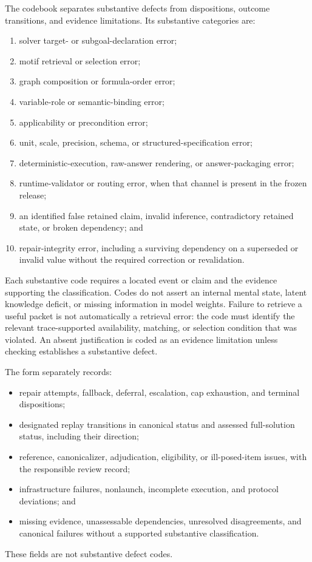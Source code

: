 \documentclass[10pt]{article} %
\providecommand{\1}{\mathbf{1}}  %
\theoremstyle{remark}
\theoremstyle{definition}
\begin{document}
The codebook separates substantive defects from dispositions,
outcome transitions, and evidence limitations. Its substantive
categories are:
\begin{enumerate}[leftmargin=*,itemsep=2pt,topsep=2pt]
    \item solver target- or subgoal-declaration error;
    \item motif retrieval or selection error;
    \item graph composition or formula-order error;
    \item variable-role or semantic-binding error;
    \item applicability or precondition error;
    \item unit, scale, precision, schema, or structured-specification
    error;
    \item deterministic-execution, raw-answer rendering, or
    answer-packaging error;
    \item runtime-validator or routing error, when that channel is
    present in the frozen release;
    \item an identified false retained claim, invalid inference,
    contradictory retained state, or broken dependency; and
    \item repair-integrity error, including a surviving dependency
    on a superseded or invalid value without the required correction
    or revalidation.
\end{enumerate}

Each substantive code requires a located event or claim and the
evidence supporting the classification. Codes do not assert an
internal mental state, latent knowledge deficit, or missing
information in model weights. Failure to retrieve a useful packet
is not automatically a retrieval error: the code must identify the
relevant trace-supported availability, matching, or selection
condition that was violated. An absent justification is coded as
an evidence limitation unless checking establishes a substantive
defect.

The form separately records:
\begin{itemize}[leftmargin=*,itemsep=2pt,topsep=2pt]
    \item repair attempts, fallback, deferral, escalation, cap
    exhaustion, and terminal dispositions;
    \item designated replay transitions in canonical status and
    assessed full-solution status, including their direction;
    \item reference, canonicalizer, adjudication, eligibility, or
    ill-posed-item issues, with the responsible review record;
    \item infrastructure failures, nonlaunch, incomplete execution,
    and protocol deviations; and
    \item missing evidence, unassessable dependencies, unresolved
    disagreements, and canonical failures without a supported
    substantive classification.
\end{itemize}
These fields are not substantive defect codes.
\end{document}
